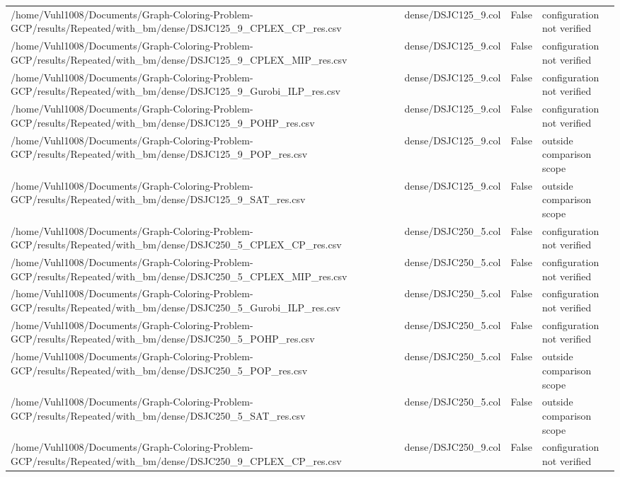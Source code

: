 \begin{table}[htbp]
\begin{tabular}{llll}
/home/Vuhl1008/Documents/Graph-Coloring-Problem-GCP/results/Repeated/with\_bm/dense/DSJC125\_9\_CPLEX\_CP\_res.csv & dense/DSJC125\_9.col & False & configuration not verified \\
/home/Vuhl1008/Documents/Graph-Coloring-Problem-GCP/results/Repeated/with\_bm/dense/DSJC125\_9\_CPLEX\_MIP\_res.csv & dense/DSJC125\_9.col & False & configuration not verified \\
/home/Vuhl1008/Documents/Graph-Coloring-Problem-GCP/results/Repeated/with\_bm/dense/DSJC125\_9\_Gurobi\_ILP\_res.csv & dense/DSJC125\_9.col & False & configuration not verified \\
/home/Vuhl1008/Documents/Graph-Coloring-Problem-GCP/results/Repeated/with\_bm/dense/DSJC125\_9\_POHP\_res.csv & dense/DSJC125\_9.col & False & configuration not verified \\
/home/Vuhl1008/Documents/Graph-Coloring-Problem-GCP/results/Repeated/with\_bm/dense/DSJC125\_9\_POP\_res.csv & dense/DSJC125\_9.col & False & outside comparison scope \\
/home/Vuhl1008/Documents/Graph-Coloring-Problem-GCP/results/Repeated/with\_bm/dense/DSJC125\_9\_SAT\_res.csv & dense/DSJC125\_9.col & False & outside comparison scope \\
/home/Vuhl1008/Documents/Graph-Coloring-Problem-GCP/results/Repeated/with\_bm/dense/DSJC250\_5\_CPLEX\_CP\_res.csv & dense/DSJC250\_5.col & False & configuration not verified \\
/home/Vuhl1008/Documents/Graph-Coloring-Problem-GCP/results/Repeated/with\_bm/dense/DSJC250\_5\_CPLEX\_MIP\_res.csv & dense/DSJC250\_5.col & False & configuration not verified \\
/home/Vuhl1008/Documents/Graph-Coloring-Problem-GCP/results/Repeated/with\_bm/dense/DSJC250\_5\_Gurobi\_ILP\_res.csv & dense/DSJC250\_5.col & False & configuration not verified \\
/home/Vuhl1008/Documents/Graph-Coloring-Problem-GCP/results/Repeated/with\_bm/dense/DSJC250\_5\_POHP\_res.csv & dense/DSJC250\_5.col & False & configuration not verified \\
/home/Vuhl1008/Documents/Graph-Coloring-Problem-GCP/results/Repeated/with\_bm/dense/DSJC250\_5\_POP\_res.csv & dense/DSJC250\_5.col & False & outside comparison scope \\
/home/Vuhl1008/Documents/Graph-Coloring-Problem-GCP/results/Repeated/with\_bm/dense/DSJC250\_5\_SAT\_res.csv & dense/DSJC250\_5.col & False & outside comparison scope \\
/home/Vuhl1008/Documents/Graph-Coloring-Problem-GCP/results/Repeated/with\_bm/dense/DSJC250\_9\_CPLEX\_CP\_res.csv & dense/DSJC250\_9.col & False & configuration not verified \\

\end{tabular}
\end{table}
